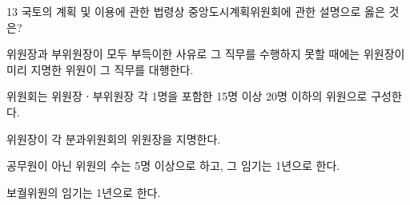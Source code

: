 \begin{question}{13}
국토의 계획 및 이용에 관한 법령상 중앙도시계획위원회에 관한 설명으로 옳은 것은?
\begin{choices}
  \item 위원장과 부위원장이 모두 부득이한 사유로 그 직무를 수행하지 못할 때에는 위원장이 미리 지명한 위원이 그 직무를 대행한다.
  \item 위원회는 위원장ㆍ부위원장 각 1명을 포함한 15명 이상 20명 이하의 위원으로 구성한다.
  \item 위원장이 각 분과위원회의 위원장을 지명한다.
  \item 공무원이 아닌 위원의 수는 5명 이상으로 하고, 그 임기는 1년으로 한다.
  \item 보궐위원의 임기는 1년으로 한다.
\end{choices}
\end{question}
